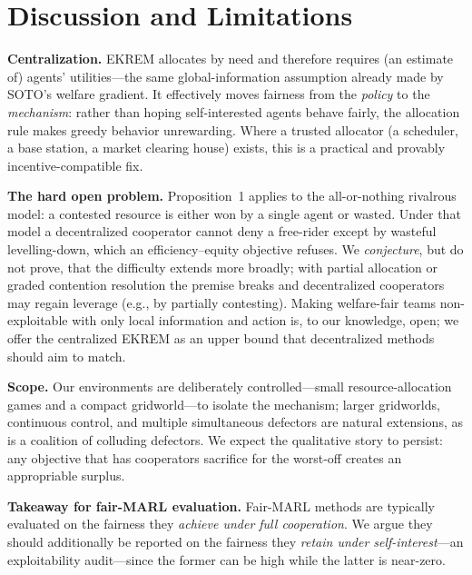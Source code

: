 \documentclass[conference, a4paper]{IEEEtran}
\begin{document}
\section{Discussion and Limitations}
\textbf{Centralization.} EKREM allocates by need and therefore requires (an
estimate of) agents' utilities---the same global-information assumption already
made by SOTO's welfare gradient. It effectively moves fairness from the
\emph{policy} to the \emph{mechanism}: rather than hoping self-interested agents
behave fairly, the allocation rule makes greedy behavior unrewarding. Where a
trusted allocator (a scheduler, a base station, a market clearing house) exists,
this is a practical and provably incentive-compatible fix.

\textbf{The hard open problem.} Proposition~1 applies to the all-or-nothing
rivalrous model: a contested resource is either won by a single agent or wasted.
Under that model a decentralized cooperator cannot deny a free-rider except by
wasteful levelling-down, which an efficiency--equity objective refuses. We
\emph{conjecture}, but do not prove, that the difficulty extends more broadly;
with partial allocation or graded contention resolution the premise breaks and
decentralized cooperators may regain leverage (e.g., by partially contesting).
Making welfare-fair teams non-exploitable with only local information and action
is, to our knowledge, open; we offer the centralized EKREM as an upper bound that
decentralized methods should aim to match.

\textbf{Scope.} Our environments are deliberately controlled---small
resource-allocation games and a compact gridworld---to isolate the mechanism;
larger gridworlds, continuous control, and multiple simultaneous defectors are
natural extensions, as is a coalition of colluding defectors. We expect the
qualitative story to persist: any objective that has cooperators sacrifice for the
worst-off creates an appropriable surplus.

\textbf{Takeaway for fair-MARL evaluation.} Fair-MARL methods are typically
evaluated on the fairness they \emph{achieve under full cooperation}. We argue they
should additionally be reported on the fairness they \emph{retain under
self-interest}---an exploitability audit---since the former can be high while the
latter is near-zero.
\end{document}
